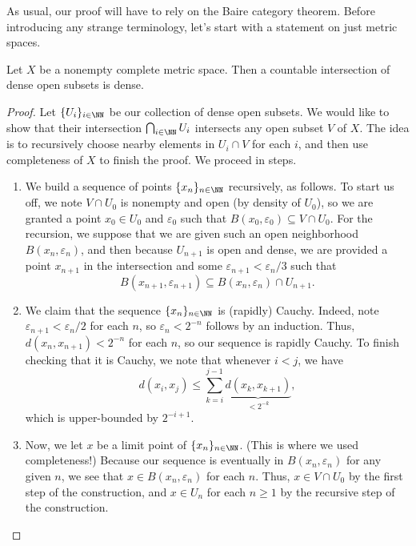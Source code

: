 \documentclass[notes.tex]{subfiles}
\begin{document}
As usual, our proof will have to rely on the Baire category theorem. Before introducing any strange terminology, let's start with a statement on just metric spaces.
\begin{lemma} \label{lem:baire-cat-start}
	Let $X$ be a nonempty complete metric space. Then a countable intersection of dense open subsets is dense.
\end{lemma}
\begin{proof}
	Let $\{U_i\}_{i\in\NN}$ be our collection of dense open subsets. We would like to show that their intersection $\bigcap_{i\in\NN}U_i$ intersects any open subset $V$ of $X$. The idea is to recursively choose nearby elements in $U_i\cap V$ for each $i$, and then use completeness of $X$ to finish the proof. We proceed in steps.
	\begin{enumerate}
		\item We build a sequence of points $\{x_n\}_{n\in\NN}$ recursively, as follows. To start us off, we note $V\cap U_0$ is nonempty and open (by density of $U_0$), so we are granted a point $x_0\in U_0$ and $\varepsilon_0$ such that $B(x_0,\varepsilon_0)\subseteq V\cap U_0$. For the recursion, we suppose that we are given such an open neighborhood $B(x_n,\varepsilon_n)$, and then because $U_{n+1}$ is open and dense, we are provided a point $x_{n+1}$ in the intersection and some $\varepsilon_{n+1}<\varepsilon_n/3$ such that
		\[B(x_{n+1},\varepsilon_{n+1})\subseteq B(x_n,\varepsilon_n)\cap U_{n+1}.\]

		\item We claim that the sequence $\{x_n\}_{n\in\NN}$ is (rapidly) Cauchy. Indeed, note $\varepsilon_{n+1}<\varepsilon_n/2$ for each $n$, so $\varepsilon_n<2^{-n}$ follows by an induction. Thus, $d(x_n,x_{n+1})<2^{-n}$ for each $n$, so our sequence is rapidly Cauchy. To finish checking that it is Cauchy, we note that whenever $i<j$, we have
		\[d(x_i,x_j)\le\sum_{k=i}^{j-1}\underbrace{d(x_k,x_{k+1})}_{<2^{-k}},\]
		which is upper-bounded by $2^{-i+1}$.

		\item Now, we let $x$ be a limit point of $\{x_n\}_{n\in\NN}$. (This is where we used completeness!) Because our sequence is eventually in $B(x_n,\varepsilon_n)$ for any given $n$, we see that $x\in B(x_n,\varepsilon_n)$ for each $n$. Thus, $x\in V\cap U_0$ by the first step of the construction, and $x\in U_n$ for each $n\ge1$ by the recursive step of the construction.
		\qedhere
	\end{enumerate}
\end{proof}
\end{document}
